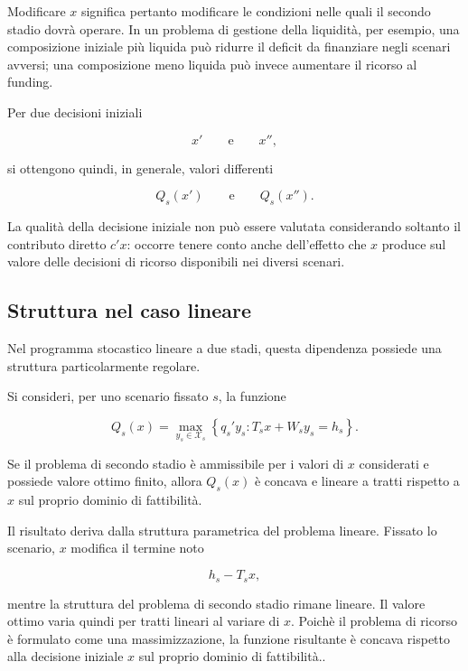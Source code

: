 Modificare $x$ significa pertanto modificare le condizioni nelle quali il
secondo stadio dovr\`a operare. In un problema di gestione della liquidit\`a,
per esempio, una composizione iniziale pi\`u liquida pu\`o ridurre il deficit
da finanziare negli scenari avversi; una composizione meno liquida pu\`o
invece aumentare il ricorso al funding.

Per due decisioni iniziali

\[
x'
\qquad\text{e}\qquad
x'',
\]

si ottengono quindi, in generale, valori differenti

\[
Q_s(x')
\qquad\text{e}\qquad
Q_s(x'').
\]

La qualit\`a della decisione iniziale non pu\`o essere valutata considerando
soltanto il contributo diretto $c'x$: occorre tenere conto anche dell'effetto
che $x$ produce sul valore delle decisioni di ricorso disponibili nei diversi
scenari.

\subsection{Struttura nel caso lineare}

Nel programma stocastico lineare a due stadi, questa dipendenza possiede una
struttura particolarmente regolare.

\begin{proposition}

Si consideri, per uno scenario fissato $s$, la funzione

\[
Q_s(x)
=
\max_{y_s\in\mathcal X_s}
\left\{
q_s'y_s:
T_sx+W_sy_s=h_s
\right\}.
\]

Se il problema di secondo stadio \`e ammissibile per i valori di $x$
considerati e possiede valore ottimo finito, allora $Q_s(x)$ \`e concava e
lineare a tratti rispetto a $x$ sul proprio dominio di fattibilit\`a.

\end{proposition}

Il risultato deriva dalla struttura parametrica del problema lineare.
Fissato lo scenario, $x$ modifica il termine noto

\[
h_s-T_sx,
\]

mentre la struttura del problema di secondo stadio rimane lineare. Il valore
ottimo varia quindi per tratti lineari al variare di $x$. Poich\`e il
problema di ricorso \`e formulato come una massimizzazione, la funzione
risultante \`e concava rispetto alla decisione iniziale $x$ sul
proprio dominio di fattibilit\`a..

